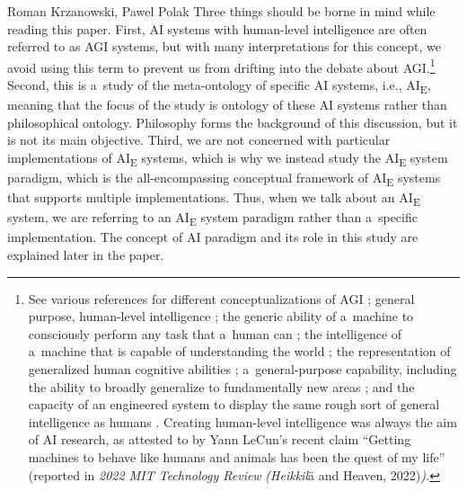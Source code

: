 \begin{artengenv2auth}{Roman Krzanowski, Pawel Polak}
Three things should be borne in mind while reading this paper. First, AI systems with human-level intelligence are often referred to as AGI systems, but with many interpretations for this concept, we avoid using this term to prevent us from drifting into the debate about AGI.\footnote{See various references for different conceptualizations of AGI
\parencites[e.g.,][p.40]{mitchell_artificial_2019}[][]{fjelland_why_2020}; %
 general purpose, human-level intelligence 
\parencite[][]{marcus_artificial_2022}; %
 the generic ability of a~machine to consciously perform any task that a~human can 
\parencite[][]{swar_unified_2022}; %
 the intelligence of a~machine that is capable of understanding the world 
\parencite[][]{skuza_what_2020}; %
 the representation of generalized human cognitive abilities 
\parencite[][]{lutkevich_what_2022}; %
 a~general-purpose capability, including the ability to broadly generalize to fundamentally new areas 
\parencite[][]{cassimatis_ability_2008}; %
 and the capacity of an engineered system to display the same rough sort of general intelligence as humans 
\parencite[][]{goertzel_artificial_2015}. %
 Creating human-level intelligence was always the aim of AI research, as attested to by Yann LeCun's recent claim ``Getting machines to behave like humans and animals has been the quest of my life'' (reported in \emph{\textup{2022 MIT Technology Review }}\label{ref:RNDzntlMH5EtX}\emph{\textup{(Heikkil}}ä and Heaven, 2022)\emph{\textup{)}.}} Second, this is a~study of the meta-ontology of specific AI systems, i.e., AI\textsubscript{E}, meaning that the focus of the study is ontology of these AI systems rather than philosophical ontology. Philosophy forms the background of this discussion, but it is not its main objective. Third, we are not concerned with particular implementations of AI\textsubscript{E} systems, which is why we instead study the AI\textsubscript{E} system paradigm, which is the all-encompassing conceptual framework of AI\textsubscript{E} systems that supports multiple implementations. Thus, when we talk about an AI\textsubscript{E} system, we are referring to an AI\textsubscript{E} system paradigm rather than a~specific implementation. The concept of AI paradigm and its role in this study are explained later in the paper.


\end{artengenv2auth}
